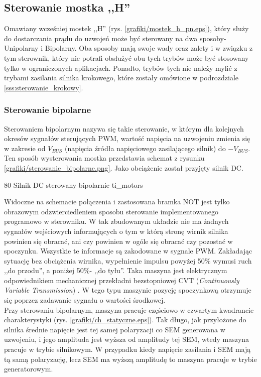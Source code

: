 \subsection{Sterowanie mostka ,,H''}

Omawiany wcześniej mostek ,,H'' (rys. \ref{grafiki/mostek_h_pn.eps}), który służy do dostarczania prądu do uzwojeń może być sterowany na dwa sposoby- Unipolarny i Bipolarny. Oba sposoby mają swoje wady oraz zalety i w związku z tym sterownik, który nie potrafi obsłużyć obu tych trybów może być stosowany tylko w ograniczonych aplikacjach. Ponadto, trybów tych nie należy mylić z trybami zasilania silnika krokowego, które zostały omówione w podrozdziale \ref{sss:sterowanie_krokowy}.

\subsubsection{Sterowanie bipolarne}

Sterowaniem bipolarnym nazywa się takie sterowanie, w którym dla kolejnych okresów sygnałów sterujących PWM, wartość napięcia na uzwojeniu zmienia się w zakresie od $ V_{BUS} $ (napięcia źródła napięciowego zasilającego silnik) do $ -V_{BUS} $. Ten sposób wysterowania mostka przedstawia schemat z rysunku \ref{grafiki/sterowanie_bipolarne.png}. Jako obciążenie został przyjęty silnik DC.

	{80}
	{Silnik DC sterowany bipolarnie}
	{ti_motors}
	
Widoczne na schemacie połączenia i zastosowana bramka NOT jest tylko obrazowym odzwierciedleniem sposobu sterowanie implementowanego programowo w sterowniku. W tak zbudowanym układzie nie ma żadnych sygnałów wejściowych informujących o tym w którą stronę wirnik silnika powinien się obracać, ani czy powinien w ogóle się obracać czy pozostać w spoczynku. Wszystkie te informacje są zakodowane w sygnale PWM. Zakładając sytuację bez obciążenia wirnika, wypełnienie impulsu powyżej 50\% wymusi ruch ,,do przodu'', a poniżej 50\%- ,,do tyłu''. Taka maszyna jest elektrycznym odpowiednikiem mechanicznej przekładni bezstopniowej CVT ({\it Continuously Variable Transmission}) \cite{ti_motors}. W tego typu maszynie pozycję spoczynkową otrzymuje się poprzez zadawanie sygnału o wartości środkowej. \\

Przy sterowaniu bipolarnym, maszyna pracuje częściowo w czwartym kwadrancie charakterystyki (rys. \ref{grafiki/ch_statyczne.eps}). Tak długo, jak przyłożone do silnika średnie napięcie jest tej samej polaryzacji co SEM generowana w uzwojeniu, i jego amplituda jest wyższa od amplitudy tej SEM, wtedy maszyna pracuje w trybie silnikowym. W przypadku kiedy napięcie zasilania i SEM mają tą samą polaryzację, lecz SEM ma wyższą amplitudę to maszyna pracuje w trybie generatorowym. \\

